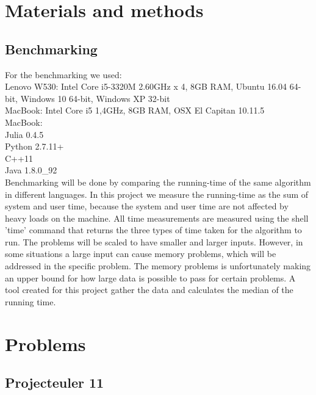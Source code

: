 \documentclass[a4paper, 11pt, titlepage]{article}
\begin{document}
\section{Materials and methods}
\subsection{Benchmarking}
For the benchmarking we used: \\
Lenovo W530: Intel Core i5-3320M 2.60GHz x 4, 8GB RAM, Ubuntu 16.04 64-bit, Windows 10 64-bit, Windows XP 32-bit \\
MacBook: Intel Core i5 1,4GHz, 8GB RAM, OSX El Capitan 10.11.5\\
MacBook: \\
Julia 0.4.5 \\
Python 2.7.11+ \\
C++11 \\
Java 1.8.0\_92 \\ 
Benchmarking will be done by comparing the running-time of the same algorithm in different languages. In this project we measure the running-time as the sum of system and user time, because the system and user time are not affected by heavy loads on the machine. All time measurements are measured using the shell 'time' command that returns the three types of time taken for the algorithm to run. The problems will be scaled to have smaller and larger inputs. However, in some situations a large input can cause memory problems, which will be addressed in the specific problem. The memory problems is unfortunately making an upper bound for how large data is possible to pass for certain problems. A tool created for this project gather the data and calculates the median of the running time. 

\section{Problems}
\subsection{Projecteuler 11}
\end{document}
